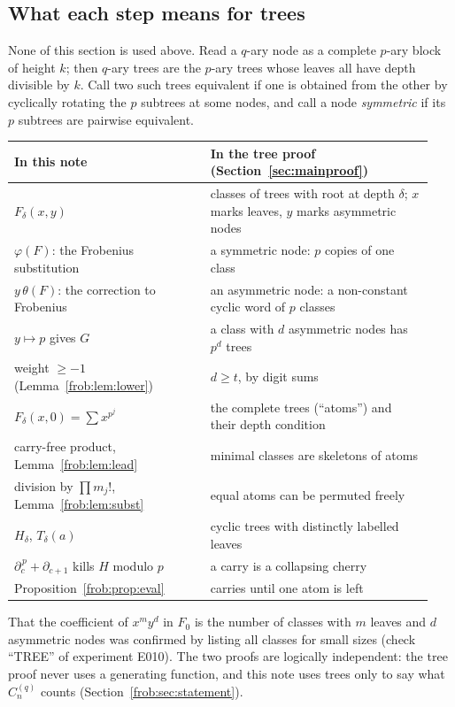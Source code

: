 \documentclass[11pt]{article}
\theoremstyle{definition}
\theoremstyle{remark}
\numberwithin{equation}{section}
\numberwithin{figure}{section}
\newcommand{\C}{C_n^{(q)}}
\begin{document}
\subsection{What each step means for trees}\label{frob:sec:dict}

None of this section is used above. Read a $q$-ary node as a complete $p$-ary block of height
$k$; then $q$-ary trees are the $p$-ary trees whose leaves all have depth divisible by $k$.
Call two such trees equivalent if one is obtained from the other by cyclically rotating the
$p$ subtrees at some nodes, and call a node \emph{symmetric} if its $p$ subtrees are pairwise
equivalent.

\begin{center}
\begin{tabular}{p{0.44\linewidth}p{0.5\linewidth}}
\textbf{In this note} & \textbf{In the tree proof (Section~\ref{sec:mainproof})}\\\hline
$F_\delta(x,y)$ & classes of trees with root at depth $\delta$; $x$ marks leaves, $y$ marks
                  asymmetric nodes\\
$\varphi(F)$: the Frobenius substitution & a symmetric node: $p$ copies of one class\\
$y\,\theta(F)$: the correction to Frobenius & an asymmetric node: a non-constant cyclic word
                  of $p$ classes\\
$y\mapsto p$ gives $G$ & a class with $d$ asymmetric nodes has $p^d$ trees\\
weight $\ge-1$ (Lemma~\ref{frob:lem:lower}) & $d\ge t$, by digit sums\\
$F_\delta(x,0)=\sum x^{p^j}$ & the complete trees (``atoms'') and their depth condition\\
carry-free product, Lemma~\ref{frob:lem:lead} & minimal classes are skeletons of atoms\\
division by $\prod m_j!$, Lemma~\ref{frob:lem:subst} & equal atoms can be permuted freely\\
$H_\delta$, $T_\delta(a)$ & cyclic trees with distinctly labelled leaves\\
$\partial_c^{\,p}+\partial_{c+1}$ kills $H$ modulo $p$ & a carry is a collapsing cherry\\
Proposition~\ref{frob:prop:eval} & carries until one atom is left\\
\end{tabular}
\end{center}

That the coefficient of $x^my^d$ in $F_0$ is the number of classes with $m$ leaves and $d$
asymmetric nodes was confirmed by listing all classes for small sizes (check ``TREE'' of
experiment E010). The two proofs are logically independent: the tree proof never uses a
generating function, and this note uses trees only to say what $\C$ counts (Section~\ref{frob:sec:statement}).
\end{document}
